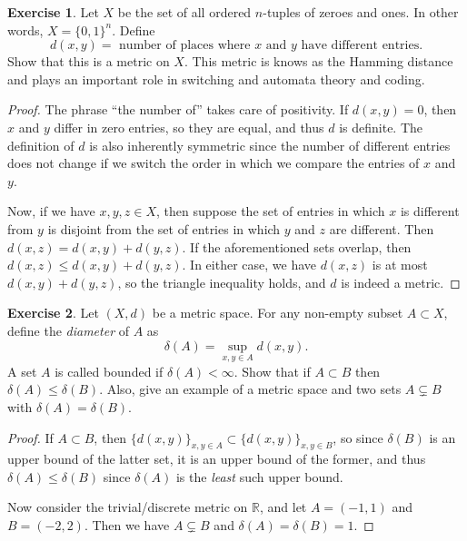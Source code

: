 \documentclass[12pt]{article}
\theoremstyle{definition}
\newtheorem{ex}{Exercise}
\begin{document}
\begin{ex}
	Let $X$ be the set of all ordered $n$-tuples of zeroes and ones.
	In other words, $X = \lbrace 0, 1 \rbrace^n$.
	Define \begin{equation*}
		d(x, y) = \text{ number of places where $x$ and $y$ have different entries.}
	\end{equation*}
	Show that this is a metric on $X$.
	This metric is knows as the Hamming distance and plays an important role in switching and automata theory and coding.
\end{ex}
\begin{proof}
	The phrase ``the number of'' takes care of positivity.
	If $d(x, y) = 0$, then $x$ and $y$ differ in zero entries, so they are equal, and thus $d$ is definite.
	The definition of $d$ is also inherently symmetric since the number of different entries does not change if we switch the order in which we compare the entries of $x$ and $y$.

	Now, if we have $x, y, z \in X$, then suppose the set of entries in which $x$ is different from $y$ is disjoint from the set of entries in which $y$ and $z$ are different.
	Then $d(x, z) = d(x, y) + d(y, z)$.
	If the aforementioned sets overlap, then $d(x, z) \leq d(x, y) + d(y, z)$.
	In either case, we have $d(x, z)$ is at most $d(x, y) + d(y, z)$, so the triangle inequality holds, and $d$ is indeed a metric.
\end{proof}

\begin{ex}
	Let $(X, d)$ be a metric space.
	For any non-empty subset $A \subset X$, define the \textit{diameter} of $A$ as \begin{equation*}
		\delta(A) = \sup_{x, y \in A} d(x, y).
	\end{equation*}
	A set $A$ is called bounded if $\delta(A) < \infty$.
	Show that if $A \subset B$ then $\delta(A) \leq \delta(B)$.
	Also, give an example of a metric space and two sets $A \subsetneq B$ with $\delta(A) = \delta(B)$.
\end{ex}
\begin{proof}
	If $A \subset B$, then $\lbrace d(x, y) \rbrace_{x,y \in A} \subset \lbrace d(x, y) \rbrace_{x,y \in B}$, so since $\delta(B)$ is an upper bound of the latter set, it is an upper bound of the former, and thus $\delta(A) \leq \delta(B)$ since $\delta(A)$ is the \textit{least} such upper bound.

	Now consider the trivial/discrete metric on $\mathbb{R}$, and let $A = (-1, 1)$ and $B = (-2, 2)$.
	Then we have $A \subsetneq B$ and $\delta(A) = \delta(B) = 1$.
\end{proof}
\end{document}
